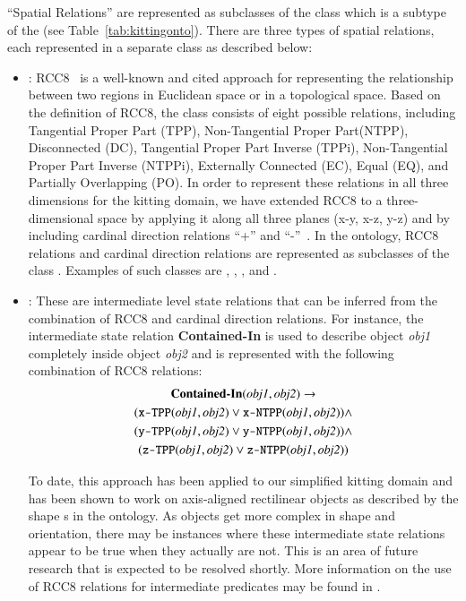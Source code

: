 ``Spatial Relations'' are represented as subclasses of the 
class which is a subtype of the  (see Table~\ref{tab:kittingonto}).
There are three types of spatial relations, each represented in a separate class as described below:
\begin{itemize}
 \item {}: RCC8~\cite{Wolter.KR.2000} is a well-known and cited
approach for representing the relationship between two regions in Euclidean space or
in a topological space. Based on the definition of RCC8, the class 
consists of eight possible relations, including Tangential Proper Part (TPP), Non-Tangential
Proper Part(NTPP), Disconnected (DC), Tangential Proper Part Inverse (TPPi), Non-Tangential
Proper Part Inverse (NTPPi), Externally Connected (EC), Equal (EQ), and Partially
Overlapping (PO). In order to represent these relations in all three dimensions for the
kitting domain, we have extended RCC8 to a three-dimensional space by applying it along
all three planes (x-y, x-z, y-z) and by including cardinal direction relations ``+''
and ``-''~\cite{SCHLENOFF.ECDRM.2012}. In the ontology, RCC8 relations and cardinal direction
relations are represented as subclasses of the class . Examples of
such classes are , , , and .

 \item {}: These are intermediate level state relations
that can be inferred from the combination of RCC8 and cardinal direction relations. For
instance, the intermediate state relation \textbf{Contained-In} is used to describe object
\textit{obj1} completely inside object \textit{obj2} and is represented with the following combination of RCC8 relations:
\begin{gather}
\textbf{Contained-In}(\textit{obj1}, \textit{obj2}) \rightarrow   \notag\\
(\texttt{x-TPP}(\textit{obj1}, \textit{obj2}) \vee \texttt{x-NTPP}(\textit{obj1}, \textit{obj2})) \wedge \notag\\
(\texttt{y-TPP}(\textit{obj1}, \textit{obj2}) \vee \texttt{y-NTPP}(\textit{obj1}, \textit{obj2})) \wedge \notag\\
(\texttt{z-TPP}(\textit{obj1}, \textit{obj2}) \vee \texttt{z-NTPP}(\textit{obj1}, \textit{obj2}))\notag
\end{gather}

To date, this approach has been applied to our simplified kitting domain and has been shown to work on axis-aligned 
rectilinear objects as described by the shape s in the ontology. As objects get more complex 
in shape and orientation, there may be instances where these intermediate state relations appear to be true 
when they actually are not. This is an area of future research that is expected to be resolved shortly. 
More information on the use of RCC8 relations for intermediate predicates may be found in \cite{Schlenoff2012}.


\end{itemize}
